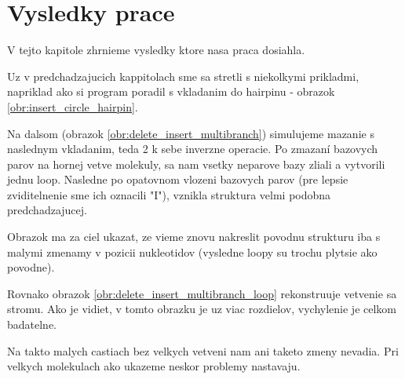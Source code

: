 
\chapter{Vysledky prace}

V tejto kapitole zhrnieme vysledky ktore nasa praca dosiahla.

Uz v predchadzajucich kappitolach sme sa stretli s niekolkymi prikladmi, napriklad ako si
program poradil s vkladanim do hairpinu - obrazok \ref{obr:insert_circle_hairpin}.

Na dalsom (obrazok \ref{obr:delete_insert_multibranch}) simulujeme mazanie s naslednym vkladanim,
teda 2 k sebe inverzne operacie. Po zmazaní bazovych parov na hornej vetve molekuly, sa nam vsetky
neparove bazy zliali a vytvorili jednu loop. Nasledne po opatovnom vlozeni bazovych parov (pre lepsie
zviditelnenie sme ich oznacili "I"), vznikla struktura velmi podobna predchadzajucej.

Obrazok ma za ciel ukazat, ze vieme znovu nakreslit povodnu strukturu iba s malymi zmenamy v pozicii
nukleotidov (vysledne loopy su trochu plytsie ako povodne).

Rovnako obrazok \ref{obr:delete_insert_multibranch_loop} rekonstruuje vetvenie sa stromu. Ako je vidiet,
v tomto obrazku je uz viac rozdielov, vychylenie je celkom badatelne.

Na takto malych castiach bez velkych vetveni nam ani taketo zmeny nevadia. Pri velkych molekulach
ako ukazeme neskor problemy nastavaju.


